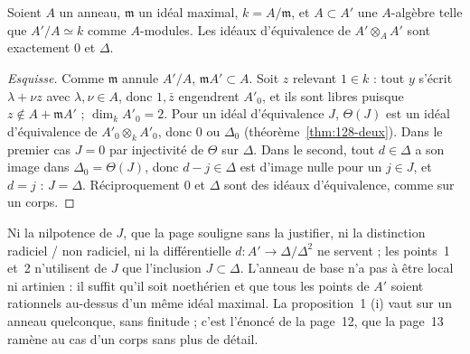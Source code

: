 \begin{encadre}
\begin{theoreme}\label{thm:128-prop1}
Soient $A$ un anneau, $\mathfrak m$ un idéal maximal, $k = A/\mathfrak m$, et $A \subset A'$ une $A$-algèbre telle que $A'/A \simeq k$ comme $A$-modules. Les idéaux d'équivalence de $A' \otimes_A A'$ sont exactement $0$ et $\Delta$.
\end{theoreme}
\end{encadre}

\begin{proof}[Esquisse]
Comme $\mathfrak m$ annule $A'/A$, $\mathfrak m A' \subset A$. Soit $z$ relevant $1 \in k$ : tout $y$ s'écrit $\lambda + \nu z$ avec $\lambda, \nu \in A$, donc $1, \bar z$ engendrent $A'_0$, et ils sont libres puisque $z \notin A + \mathfrak m A'$ ; $\dim_k A'_0 = 2$. Pour un idéal d'équivalence $J$, $\Theta(J)$ est un idéal d'équivalence de $A'_0 \otimes_k A'_0$, donc $0$ ou $\Delta_0$ (théorème~\ref{thm:128-deux}). Dans le premier cas $J = 0$ par injectivité de $\Theta$ sur $\Delta$. Dans le second, tout $d \in \Delta$ a son image dans $\Delta_0 = \Theta(J)$, donc $d - j \in \Delta$ est d'image nulle pour un $j \in J$, et $d = j$ : $J = \Delta$. Réciproquement $0$ et $\Delta$ sont des idéaux d'équivalence, comme sur un corps.
\end{proof}

\begin{remarque}
Ni la nilpotence de $J$, que la page souligne sans la justifier, ni la distinction radiciel / non radiciel, ni la différentielle $d : A' \to \Delta/\Delta^2$ ne servent ; les points~1 et~2 n'utilisent de $J$ que l'inclusion $J \subset \Delta$. L'anneau de base n'a pas à être local ni artinien : il suffit qu'il soit noethérien et que tous les points de $A'$ soient rationnels au-dessus d'un même idéal maximal. La proposition~1 (i) vaut sur un anneau quelconque, sans finitude ; c'est l'énoncé de la page~12, que la page~13 ramène au cas d'un corps sans plus de détail.
\end{remarque}

